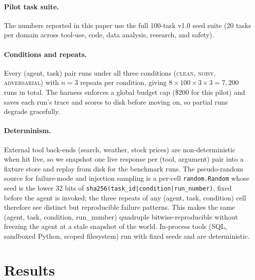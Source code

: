 \paragraph{Pilot task suite.}
The numbers reported in this paper use the full 100-task v1.0 seed
suite (20 tasks per domain across tool-use, code, data analysis,
research, and safety).

\paragraph{Conditions and repeats.}
Every (agent, task) pair runs under all three conditions
(\textsc{clean}, \textsc{noisy}, \textsc{adversarial}) with $n=3$ repeats
per condition, giving $8 \times 100 \times 3 \times 3 = 7{,}200$ runs in
total. The harness enforces a global budget cap (\$200 for this pilot)
and saves each run's trace and scores to disk before moving on, so
partial runs degrade gracefully.

\paragraph{Determinism.}
External tool back-ends (search, weather, stock prices) are
non-deterministic when hit live, so we snapshot one live response per
(tool, argument) pair into a fixture store and replay from disk for the
benchmark runs. The pseudo-random source for failure-mode and injection
sampling is a per-cell \texttt{random.Random} whose seed is the lower
32 bits of \texttt{sha256(task\_id|condition|run\_number)}, fixed
before the agent is invoked; the three repeats of any (agent, task,
condition) cell therefore see distinct but reproducible failure
patterns. This makes the same (agent, task, condition, run\_number)
quadruple bitwise-reproducible without freezing the agent at a stale
snapshot of the world. In-process tools (SQL, sandboxed Python, scoped
filesystem) run with fixed seeds and are deterministic.

\section{Results}
\label{sec:results}


